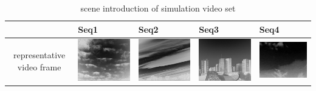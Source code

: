 \documentclass[journal]{IEEEtran}
\begin{document}
\begin{table}[ht]
  \centering
  \caption{scene introduction of simulation video set}
  \label{tab1}
  \begin{tabular}{|c|m{3cm}<{\centering}|m{3cm}<{\centering}|m{3cm}<{\centering}|m{3.2cm}<{\centering}|}
    \hline
    &Seq1 &Seq2 &Seq3 &Seq4\\
    \hline
    representative video frame& \includegraphics[scale=0.33]{back1.png}& \includegraphics[scale=0.25]{back2.png}& \includegraphics[scale=0.33]{back3.png}& \includegraphics[scale=0.3]{back4.png}\\

\end{tabular}
\end{table}
\end{document}
